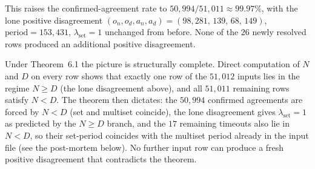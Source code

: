 \documentclass[11pt]{article}
\begin{document}
This raises the confirmed-agreement rate to
$50{,}994 / 51{,}011 \approx 99.97\%$, with the lone positive
disagreement
$(o_n,o_d,a_n,a_d) = (98{,}281,\,139,\,68,\,149)$,
$\mathrm{period} = 153{,}431$, $\lambda_{\text{set}} = 1$
unchanged from before. None of the $26$ newly resolved rows produced an
additional positive disagreement.

Under Theorem~6.1 the picture is structurally complete. Direct
computation of $N$ and $D$ on every row shows that exactly one row
of the $51{,}012$ inputs lies in the regime $N \ge D$ (the lone
disagreement above), and all $51{,}011$ remaining rows satisfy $N < D$.
The theorem then dictates: the $50{,}994$ confirmed agreements are
forced by $N < D$ (set and multiset coincide), the lone disagreement
gives $\lambda_{\text{set}} = 1$ as predicted by the $N \ge D$ branch,
and the $17$ remaining timeouts also lie in $N < D$, so their
set-period coincides with the multiset period already in the input file
(see the post-mortem below). No further input row can produce a fresh
positive disagreement that contradicts the theorem.
\end{document}
